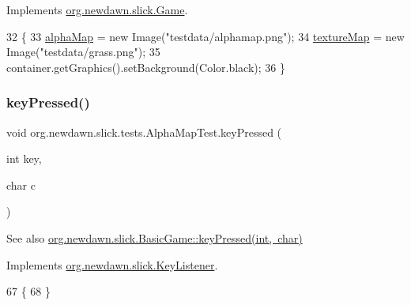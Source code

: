 Implements \mbox{\hyperlink{interfaceorg_1_1newdawn_1_1slick_1_1_game_ad2dd6affab08bb8fdb5fab0815957b7a}{org.\+newdawn.\+slick.\+Game}}.


\begin{DoxyCode}
32                                                                     \{
33         \mbox{\hyperlink{classorg_1_1newdawn_1_1slick_1_1tests_1_1_alpha_map_test_a1feaeb3164bd0e648d4f9cf7a63ce24a}{alphaMap}} = \textcolor{keyword}{new} Image(\textcolor{stringliteral}{"testdata/alphamap.png"});
34         \mbox{\hyperlink{classorg_1_1newdawn_1_1slick_1_1tests_1_1_alpha_map_test_a1ba492928b78eceb9442f13fb61a45f3}{textureMap}} = \textcolor{keyword}{new} Image(\textcolor{stringliteral}{"testdata/grass.png"});
35         container.getGraphics().setBackground(Color.black);
36     \}
\end{DoxyCode}
\mbox{\label{classorg_1_1newdawn_1_1slick_1_1tests_1_1_alpha_map_test_a2197f031e4bcff4d6fee89d27fdce412}} 
\subsubsection{\texorpdfstring{key\+Pressed()}{keyPressed()}}
{\footnotesize\ttfamily void org.\+newdawn.\+slick.\+tests.\+Alpha\+Map\+Test.\+key\+Pressed (\begin{DoxyParamCaption}\item[{int}]{key,  }\item[{char}]{c }\end{DoxyParamCaption})\hspace{0.3cm}{\ttfamily [inline]}}

\begin{DoxySeeAlso}{See also}
\mbox{\hyperlink{classorg_1_1newdawn_1_1slick_1_1_basic_game_a4fbb3345b5abf5ddd54a99466d07f02f}{org.\+newdawn.\+slick.\+Basic\+Game\+::key\+Pressed(int, char)}} 
\end{DoxySeeAlso}


Implements \mbox{\hyperlink{interfaceorg_1_1newdawn_1_1slick_1_1_key_listener_ac0b0568a21ef486c4f51382614c196ef}{org.\+newdawn.\+slick.\+Key\+Listener}}.


\begin{DoxyCode}
67                                             \{
68     \}
\end{DoxyCode}
\mbox{\label{classorg_1_1newdawn_1_1slick_1_1tests_1_1_alpha_map_test_a9d30318bcf8f95383bfaf3a7ef3ed6e6}} 
